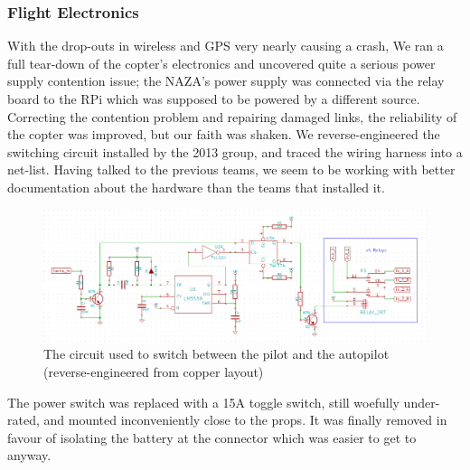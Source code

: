 \documentclass[a4paper, 11pt, titlepage]{article}
\begin{document}
    \subsubsection{Flight Electronics}
      With the drop-outs in wireless and GPS very nearly causing a crash, We ran a full tear-down of the copter's electronics and uncovered quite a serious power supply contention issue; the NAZA's power supply was connected via the relay board to the RPi which was supposed to be powered by a different source.  Correcting the contention problem and repairing damaged links, the reliability of the copter was improved, but our faith was shaken.  
      We reverse-engineered the switching circuit installed by the 2013 group, and traced the wiring harness into a net-list.  Having talked to the previous teams, we seem to be working with better documentation about the hardware than the teams that installed it.
      \begin{figure}[h!]
        \centering
        \includegraphics[width=1\textwidth]{SwitchCircuit.png}
        \caption{The circuit used to switch between the pilot and the autopilot (reverse-engineered from copper layout)}
      \end{figure}

      The power switch was replaced with a 15A toggle switch, still woefully under-rated, and mounted inconveniently close to the props.  It was finally removed in favour of isolating the battery at the connector which was easier to get to anyway.
\end{document}
